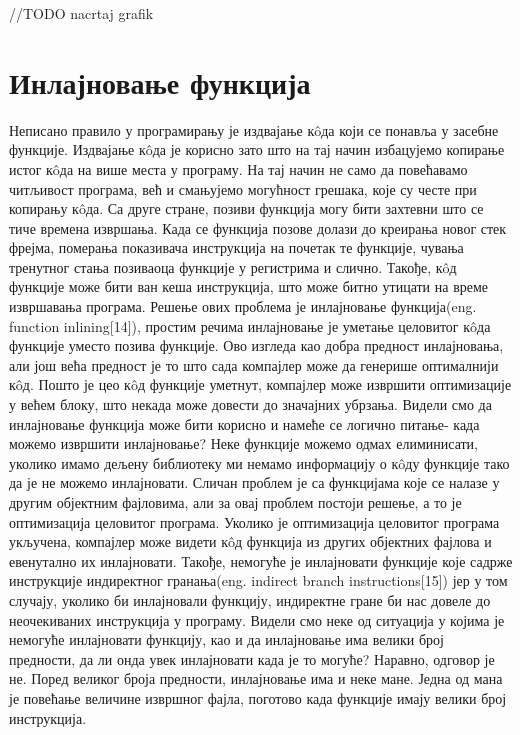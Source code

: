 \documentclass[12pt,oneside]{memoir}
\begin{document}
//TODO nacrtaj grafik

\section{Инлајновање функција}

Неписано правило у програмирању је издвајање к\^{o}да који се понавља у 
засебне функције.
Издвајање к\^{o}да је корисно зато што на тај начин избацујемо копирање
истог к\^{o}да на више места у програму.
На тај начин не само да повећавамо читљивост програма, већ и смањујемо
могућност грешака, које су честе при копирању  к\^{o}да.
Са друге стране, позиви функција могу бити захтевни што се тиче времена извршања.
Када се функција позове долази до креирања новог стек фрејма, померања показивача
инструкција на почетак те функције, чувања тренутног стања позиваоца функције у 
регистрима и слично.
Такође,  к\^{o}д функције може бити ван кеша инструкција, што може битно
утицати на време извршавања програма.
Решење ових проблема је инлајновање функција(eng. function inlining[14]), простим
речима инлајновање је уметање целовитог к\^{o}да функције уместо позива функције.
Ово изгледа као добра предност инлајновања, али још већа предност је то што 
сада компајлер може да генерише оптималнији  к\^{o}д.
Пошто је цео к\^{o}д функције уметнут, компајлер може извршити оптимизације у већем
блоку, што некада може довести до значајних убрзања.
Видели смо да инлајновање функција може бити корисно и намеће се логично питање-
када можемо извршити инлајновање?
Неке функције можемо одмах елиминисати, уколико имамо дељену библиотеку ми немамо
информацију о к\^{o}ду функције тако да је не можемо инлајновати.
Сличан проблем је са функцијама које се налазе у другим објектним фајловима, али за
овај проблем постоји решење, а то је оптимизација целовитог програма.
Уколико је оптимизација целовитог програма укључена, компајлер може видети
к\^{o}д функција из других објектних фајлова и евенутално их инлајновати.
Такође, немогуће је инлајновати функције које садрже инструкције индиректног
гранања(eng. indirect branch instructions[15]) јер у том случају, уколико би 
инлајновали функцију, индиректне гране би нас довеле до неочекиваних инструкција
у програму.
Видели смо неке од ситуација у којима је немогуће инлајновати функцију, као и да
инлајновање има велики број предности, да ли онда увек инлајновати када је то 
могуће?
Наравно, одговор је не. 
Поред великог броја предности, инлајновање има и неке мане.
Једна од мана је повећање величине извршног фајла, поготово када функције имају
велики број инструкција.
\end{document}
